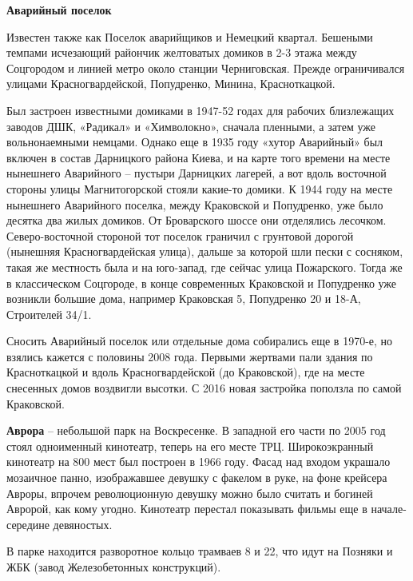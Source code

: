 \medskip

\textbf{Аварийный поселок}

Известен также как Поселок аварийщиков и Немецкий квартал. Бешеными темпами исчезающий райончик желтоватых домиков в 2-3 этажа между Соцгородом и линией метро около станции Черниговская. Прежде ограничивался улицами Красногвардейской, Попудренко, Минина, Красноткацкой. 

Был застроен известными домиками в 1947-52 годах для рабочих близлежащих заводов ДШК, «Радикал» и «Химволокно», сначала пленными, а затем уже вольнонаемными немцами. Однако еще в 1935 году «хутор Аварийный» был включен в состав Дарницкого района Киева, и на карте того времени на месте нынешнего Аварийного – пустыри Дарницких лагерей, а вот вдоль восточной стороны улицы Магнитогорской стояли какие-то домики. К 1944 году на месте нынешнего Аварийного поселка, между Краковской и Попудренко, уже было десятка два жилых домиков. От Броварского шоссе они отделялись лесочком. Северо-восточной стороной тот поселок граничил с грунтовой дорогой (нынешняя Красногвардейская улица), дальше за которой шли пески с сосняком, такая же местность была и на юго-запад, где сейчас улица Пожарского. Тогда же в классическом Соцгороде, в конце современных Краковской и Попудренко уже возникли большие дома, например Краковская 5, Попудренко 20 и 18-А, Строителей 34/1.

Сносить Аварийный поселок или отдельные дома собирались еще в 1970-е, но взялись кажется с половины 2008 года. Первыми жертвами пали здания по Красноткацкой и вдоль Красногвардейской (до Краковской), где на месте снесенных домов воздвигли высотки. С 2016 новая застройка поползла по самой Краковской.\\

\medskip

\textbf{Аврора} – небольшой парк на Воскресенке. В западной его части по 2005 год стоял одноименный кинотеатр, теперь на его месте ТРЦ. Широкоэкранный кинотеатр на 800 мест был построен в 1966 году. Фасад над входом украшало мозаичное панно, изображавшее девушку с факелом в руке, на фоне крейсера Авроры, впрочем революционную девушку можно было считать и богиней Авророй, как кому угодно. Кинотеатр перестал показывать фильмы еще в начале-середине девяностых.

В парке находится разворотное кольцо трамваев 8 и 22, что идут на Позняки и ЖБК (завод Железобетонных конструкций).\\

\medskip


